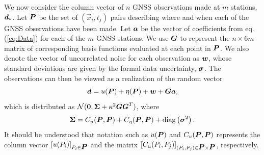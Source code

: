 \documentclass[extra,mreferee]{gji}
\begin{document}
We now consider the column vector of $n$ GNSS observations made at $m$ stations, $\mitbf{d}_*$. Let $\mitbf{P}$ be the set of $(\vec{x}_i, t_j)$ pairs describing where and when each of the GNSS observations have been made. Let $\mitbf{a}$ be the vector of coefficients from eq. (\ref{eq:Data}) for each of the $m$ GNSS stations. We use $\mitbf{G}$ to represent the $n \times 6m$ matrix of corresponding basis functions evaluated at each point in $\mitbf{P}$. We  also denote the vector of uncorrelated noise for each observation as $\mitbf{w}$, whose standard deviations are given by the formal data uncertainty, $\mitbf{\sigma}$. The observations can then be viewed as a realization of the random vector
\begin{equation}
\mitbf{d} = u(\mitbf{P}) + \eta(\mitbf{P}) + \mitbf{w} + \mitbf{G}\mitbf{a},
\end{equation}
which is distributed as $\mathcal{N}(\mitbf{0},\mitbf{\Sigma} + \kappa^2\mitbf{G}\mitbf{G}^T)$, where
\begin{equation}\label{eq:Cd}
\mitbf{\Sigma} = C_u(\mitbf{P},\mitbf{P}) + C_\eta(\mitbf{P},\mitbf{P}) + 
              \mathrm{diag}\left(\mitbf{\sigma}^2\right).  
\end{equation}
It should be understood that notation such as $u(\mitbf{P})$ and $C_u(\mitbf{P},\mitbf{P})$ represents the column vector $[u(P_i)]_{P_i \in \mitbf{P}}$ and the matrix $[C_u(P_i,P_j)]_{(P_i,P_j) \in \mitbf{P} \times \mitbf{P}}$, respectively. 
\end{document}
